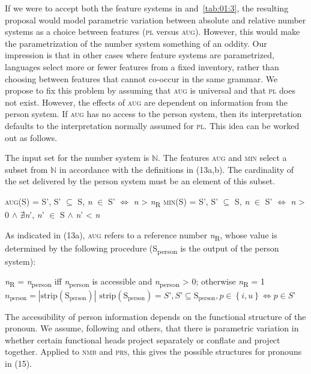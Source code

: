 \documentclass[output=paper]{langsci/langscibook}
\begin{document}
If we were to accept both the feature systems in  and~\ref{tab:01:3}, the resulting proposal would model parametric variation between absolute and relative number systems as a choice between features (\textsc{pl} versus \textsc{aug}). However, this would make the parametrization of the number system something of an oddity. Our impression is that in other cases where feature systems are parametrized, languages select more or fewer features from a fixed inventory, rather than choosing between features that cannot co-occur in the same grammar. We propose to fix this problem by assuming that \textsc{aug} is universal and that \textsc{pl} does not exist. However, the effects of \textsc{aug} are dependent on information from the person system. If \textsc{aug} has no access to the person system, then its interpretation defaults to the interpretation normally assumed for \textsc{pl}. This idea can be worked out as follows.

The input set for the number system is $\mathbb{N}$. The features \textsc{aug} and \textsc{min} select a subset from $\mathbb{N}$ in accordance with the definitions in (13a,b). The cardinality of the set delivered by the person system must be an element of this subset. 

\ea 
\ea \label{bkm:Ref234211253}   \textsc{aug}(S)  =  S’,  S’ ${\subseteq}$ S,  \textit{n} ${\in}$ S’ $\Leftrightarrow $ \textit{n} > \textit{n}\textsubscript{R}
\ex  \textsc{min}(S)  =  S’,  S’ ${\subseteq}$ S,  \textit{n} ${\in}$ S’ $\Leftrightarrow $ \textit{n} > 0 ${\wedge}$ ${\nexists}$\textit{n}’, \textit{n}’ ${\in}$ S ${\wedge}$ \textit{n}’ < \textit{n}
\z
\z

As indicated in (13a), \textsc{aug} refers to a reference number \textit{n}\textsubscript{R}, whose value is determined by the following procedure (S\textsubscript{person} is the output of the person system):

\ea \label{bkm:Ref453320625}
\ea \textit{n}\textsubscript{R} = \textit{n}\textsubscript{person} iff \textit{n}\textsubscript{person} is accessible and \textit{n}\textsubscript{person} > 0; otherwise \textit{n}\textsubscript{R} = 1
\ex $n_{\text{person}} = \left|\text{strip}\left(\text{S}_{\text{person}}\right)\right|$
\ex $\text{strip}\left(\text{S}_{\text{person}}\right)  =  S’,  S’ \subseteq \text{S}_{\text{person}},  p \in \left\{i, u\right\} \Leftrightarrow  p \in S’ $
\z
\z

The accessibility of person information depends on the functional structure of the pronoun. We assume, following \citet{Platzack1983} and others, that there is parametric variation in whether certain functional heads project separately or conflate and project together. Applied to \textsc{nmb} and \textsc{prs}, this gives the possible structures for pronouns in (15).
\end{document}
